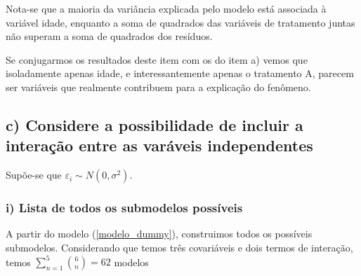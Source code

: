 \documentclass[
  letterpaper,
  DIV=11,
  numbers=noendperiod]{scrartcl}
\begin{document}
Nota-se que a maioria da variância explicada pelo modelo está associada
à variável idade, enquanto a soma de quadrados das variáveis de
tratamento juntas não superam a soma de quadrados dos resíduos.

Se conjugarmos os resultados deste item com os do item a) vemos que
isoladamente apenas idade, e interessantemente apenas o tratamento A,
parecem ser variáveis que realmente contribuem para a explicação do
fenômeno.

\hypertarget{c-considere-a-possibilidade-de-incluir-a-interauxe7uxe3o-entre-as-varuxe1veis-independentes}{%
\subsection{c) Considere a possibilidade de incluir a interação entre as
varáveis
independentes}\label{c-considere-a-possibilidade-de-incluir-a-interauxe7uxe3o-entre-as-varuxe1veis-independentes}}

Supõe-se que \(\varepsilon_i \sim N(0, \sigma^2)\).

\hypertarget{i-lista-de-todos-os-submodelos-possuxedveis}{%
\subsubsection{i) Lista de todos os submodelos
possíveis}\label{i-lista-de-todos-os-submodelos-possuxedveis}}

A partir do modelo (\ref{modelo_dummy}), construimos todos os possíveis
submodelos. Considerando que temos três covariáveis e dois termos de
interação, temos \(\sum\limits_{n = 1}^5\binom{6}{n} = 62\) modelos
\end{document}
